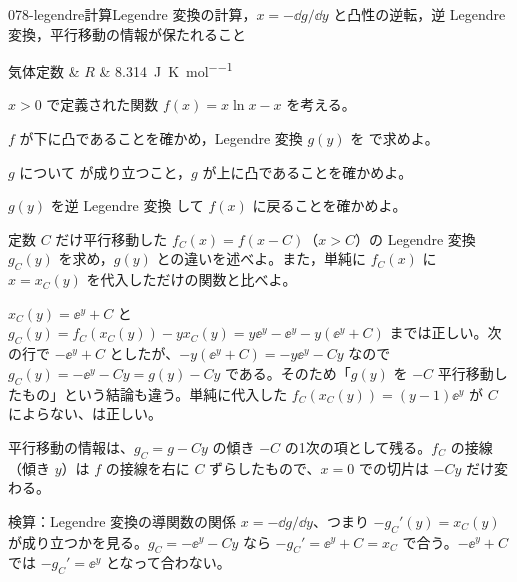 \documentclass[uplatex,dvipdfmx,a4paper,11pt]{jsarticle}
\begin{document}
\begin{mondai}{078-legendre}{計算}{Legendre 変換の計算，$x = -\dd g/\dd y$ と凸性の逆転，逆 Legendre 変換，平行移動の情報が保たれること}
\begin{teisuu}
  気体定数 & $R$ & \qty{8.314}{\joule\per\kelvin\per\mole}\\
\end{teisuu}
$x > 0$ で定義された関数 $f(x) = x\ln x - x$ を考える。
  \begin{shoumon}
    \item $f$ が下に凸であることを確かめ，Legendre 変換 $g(y)$ を  で求めよ。
    \item $g$ について  が成り立つこと，$g$ が上に凸であることを確かめよ。
    \item $g(y)$ を逆 Legendre 変換  して $f(x)$ に戻ることを確かめよ。
    \item 定数 $C$ だけ平行移動した $f_{C}(x) = f(x - C)$（$x > C$）の Legendre 変換 $g_{C}(y)$ を求め，$g(y)$ との違いを述べよ。また，単純に $f_{C}(x)$ に $x = x_{C}(y)$ を代入しただけの関数と比べよ。
  \end{shoumon}

\begin{kotaeran}
   $x_{C}(y)=\ee^{y}+C$ と $g_{C}(y)=f_{C}(x_{C}(y))-yx_{C}(y)=y\ee^{y}-\ee^{y}-y(\ee^{y}+C)$ までは正しい。次の行で $-\ee^{y}+C$ としたが、$-y(\ee^{y}+C)=-y\ee^{y}-Cy$ なので $g_{C}(y)=-\ee^{y}-Cy=g(y)-Cy$ である。そのため「$g(y)$ を $-C$ 平行移動したもの」という結論も違う。単純に代入した $f_{C}(x_{C}(y))=(y-1)\ee^{y}$ が $C$ によらない、は正しい。
\end{kotaeran}
\begin{rikai}
  \item 平行移動の情報は、$g_{C}=g-Cy$ の傾き $-C$ の1次の項として残る。$f_{C}$ の接線（傾き $y$）は $f$ の接線を右に $C$ ずらしたもので、$x=0$ での切片は $-Cy$ だけ変わる。
  \item 検算：Legendre 変換の導関数の関係 $x=-\dd g/\dd y$、つまり $-g_{C}'(y)=x_{C}(y)$ が成り立つかを見る。$g_{C}=-\ee^{y}-Cy$ なら $-g_{C}'=\ee^{y}+C=x_{C}$ で合う。$-\ee^{y}+C$ では $-g_{C}'=\ee^{y}$ となって合わない。
\end{rikai}
\end{mondai}
\end{document}
